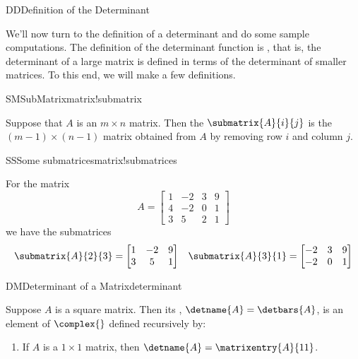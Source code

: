 \begin{subsect}{DD}{Definition of the Determinant}
%
\begin{para}We'll now turn to the definition of a determinant and do some sample computations.  The definition of the determinant function is , that is, the determinant of a large matrix is defined in terms of the determinant of smaller matrices.  To this end, we will make a few definitions.\end{para}
%
\begin{definition}{SM}{SubMatrix}{matrix!submatrix}
\begin{para}Suppose that $A$ is an $m\times n$ matrix.  Then the  $\submatrix{A}{i}{j}$ is the $(m-1)\times (n-1)$ matrix obtained from $A$ by removing row $i$ and column $j$.\end{para}
\end{definition}
%
%
\begin{example}{SS}{Some submatrices}{matrix!submatrices}
\begin{para}For the matrix
%
\begin{equation*}
A=
\begin{bmatrix}
1 & -2 & 3 & 9\\
4 & -2 & 0 & 1\\
3 & 5 & 2 & 1
\end{bmatrix}
\end{equation*}
%
we have the submatrices
%
%
\begin{align*}
\submatrix{A}{2}{3}
=
\begin{bmatrix}
1 & -2 & 9\\
3 & 5 & 1
\end{bmatrix}
&&
\submatrix{A}{3}{1}
=
\begin{bmatrix}
-2 & 3 & 9\\
-2 & 0 & 1
\end{bmatrix}
\end{align*}
\end{para}
%
\end{example}
%
%
\begin{definition}{DM}{Determinant of a Matrix}{determinant}
\begin{para}Suppose $A$ is a square matrix.  Then its , $\detname{A}=\detbars{A}$, is an element of $\complex{\null}$ defined recursively by:
\begin{enumerate}    
\item If $A$ is a $1\times 1$ matrix, then $\detname{A}=\matrixentry{A}{11}$.

\end{enumerate}
\end{para}
\end{definition}
\end{subsect}
